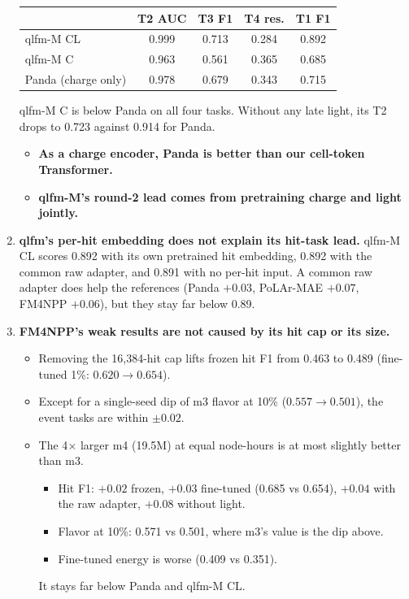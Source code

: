 \documentclass[11pt,a4paper]{article}
\begin{document}
\begin{enumerate}[leftmargin=*]
  \begin{center}\small
  \begin{tabular}{lcccc}
  \toprule
   & T2 AUC & T3 F1 & T4 res. & T1 F1\\
  \midrule
  qlfm-M CL & 0.999 & 0.713 & 0.284 & 0.892\\
  qlfm-M C & 0.963 & 0.561 & 0.365 & 0.685\\
  Panda (charge only) & 0.978 & 0.679 & 0.343 & 0.715\\
  \bottomrule
  \end{tabular}
  \end{center}

  qlfm-M C is below Panda on all four tasks. Without any late light, its T2 drops to 0.723 against 0.914 for Panda.
  \begin{itemize}
    \item \textbf{As a charge encoder, Panda is better than our cell-token Transformer.}
    \item \textbf{qlfm-M's round-2 lead comes from pretraining charge and light jointly.}
  \end{itemize}

\item \textbf{qlfm's per-hit embedding does not explain its hit-task lead.} qlfm-M CL scores 0.892 with its own pretrained hit embedding, 0.892 with the common raw adapter, and 0.891 with no per-hit input. A common raw adapter does help the references (Panda $+0.03$, PoLAr-MAE $+0.07$, FM4NPP $+0.06$), but they stay far below 0.89.

\item \textbf{FM4NPP's weak results are not caused by its hit cap or its size.}
  \begin{itemize}
    \item Removing the 16{,}384-hit cap lifts frozen hit F1 from 0.463 to 0.489 (fine-tuned 1\%: $0.620\to0.654$).
    \item Except for a single-seed dip of m3 flavor at 10\% ($0.557\to0.501$), the event tasks are within $\pm0.02$.
    \item The 4$\times$ larger m4 (19.5M) at equal node-hours is at most slightly better than m3.
      \begin{itemize}
        \item Hit F1: $+0.02$ frozen, $+0.03$ fine-tuned (0.685 vs 0.654), $+0.04$ with the raw adapter, $+0.08$ without light.
        \item Flavor at 10\%: 0.571 vs 0.501, where m3's value is the dip above.
        \item Fine-tuned energy is worse (0.409 vs 0.351).
      \end{itemize}
      It stays far below Panda and qlfm-M CL.
  \end{itemize}
\end{enumerate}
\end{document}

